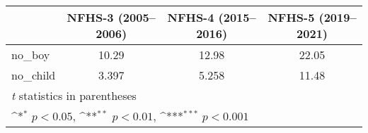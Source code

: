 {
\def\sym#1{\ifmmode^{#1}\else\(^{#1}\)\fi}
\begin{tabular}{l*{3}{c}}
\hline\hline
            &\multicolumn{1}{c}{NFHS-3 (2005–2006)}&\multicolumn{1}{c}{NFHS-4 (2015–2016)}&\multicolumn{1}{c}{NFHS-5 (2019–2021)}\\
\hline
\hline
no\_boy      &       10.29         &       12.98         &       22.05         \\
no\_child    &       3.397         &       5.258         &       11.48         \\
\hline\hline
\multicolumn{4}{l}{\footnotesize \textit{t} statistics in parentheses}\\
\multicolumn{4}{l}{\footnotesize \sym{*} \(p<0.05\), \sym{**} \(p<0.01\), \sym{***} \(p<0.001\)}\\
\end{tabular}
}
